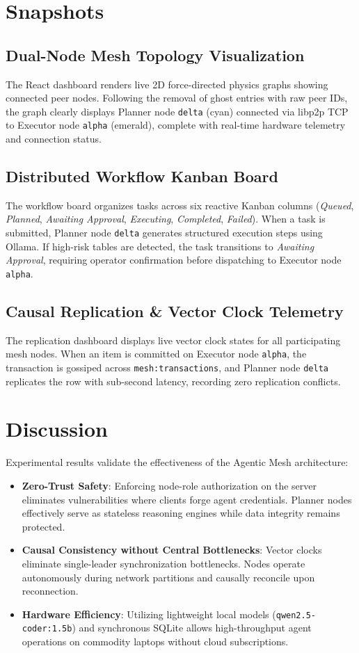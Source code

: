 \documentclass[12pt,a4paper]{report}
\begin{document}
\section{Snapshots}

\subsection{Dual-Node Mesh Topology Visualization}
The React dashboard renders live 2D force-directed physics graphs showing connected peer nodes. Following the removal of ghost entries with raw peer IDs, the graph clearly displays Planner node \texttt{delta} (cyan) connected via libp2p TCP to Executor node \texttt{alpha} (emerald), complete with real-time hardware telemetry and connection status.

\subsection{Distributed Workflow Kanban Board}
The workflow board organizes tasks across six reactive Kanban columns (\textit{Queued}, \textit{Planned}, \textit{Awaiting Approval}, \textit{Executing}, \textit{Completed}, \textit{Failed}). When a task is submitted, Planner node \texttt{delta} generates structured execution steps using Ollama. If high-risk tables are detected, the task transitions to \textit{Awaiting Approval}, requiring operator confirmation before dispatching to Executor node \texttt{alpha}.

\subsection{Causal Replication \& Vector Clock Telemetry}
The replication dashboard displays live vector clock states for all participating mesh nodes. When an item is committed on Executor node \texttt{alpha}, the transaction is gossiped across \texttt{mesh:transactions}, and Planner node \texttt{delta} replicates the row with sub-second latency, recording zero replication conflicts.

\section{Discussion}
Experimental results validate the effectiveness of the Agentic Mesh architecture:
\begin{itemize}[leftmargin=*,itemsep=2pt]
    \item \textbf{Zero-Trust Safety}: Enforcing node-role authorization on the server eliminates vulnerabilities where clients forge agent credentials. Planner nodes effectively serve as stateless reasoning engines while data integrity remains protected.
    \item \textbf{Causal Consistency without Central Bottlenecks}: Vector clocks eliminate single-leader synchronization bottlenecks. Nodes operate autonomously during network partitions and causally reconcile upon reconnection.
    \item \textbf{Hardware Efficiency}: Utilizing lightweight local models (\texttt{qwen2.5-coder:1.5b}) and synchronous SQLite allows high-throughput agent operations on commodity laptops without cloud subscriptions.
\end{itemize}
\end{document}
